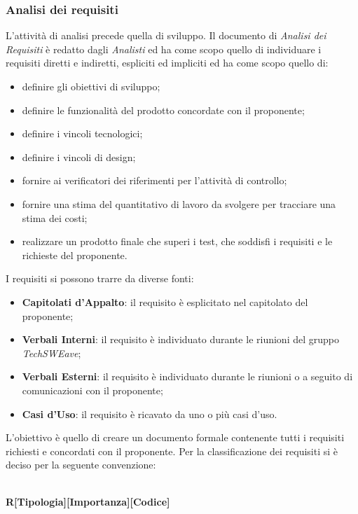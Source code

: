 \subsubsection{Analisi dei requisiti}
L’attività di analisi precede quella di sviluppo. Il documento di \textit{Analisi dei Requisiti} è redatto dagli \textit{Analisti} ed ha come scopo quello di individuare i requisiti diretti e indiretti, espliciti ed impliciti ed ha come scopo quello di:
\begin{itemize}
    \item definire gli obiettivi di sviluppo;
    \item definire le funzionalità del prodotto concordate con il proponente;
    \item definire i vincoli tecnologici;
    \item definire i vincoli di design;
    \item fornire ai verificatori dei riferimenti per l’attività di controllo;
    \item fornire una stima del quantitativo di lavoro da svolgere per tracciare una stima dei costi;
    \item realizzare un prodotto finale che superi i test, che soddisfi i requisiti e le richieste del proponente.
\end{itemize}
I requisiti si possono trarre da diverse fonti:
\begin{itemize}
    \item \textbf{Capitolati d'Appalto}: il requisito è esplicitato nel capitolato del proponente;
    \item \textbf{Verbali Interni}: il requisito è individuato durante le riunioni del gruppo \textit{TechSWEave};
    \item \textbf{Verbali Esterni}: il requisito è individuato durante le riunioni o a seguito di comunicazioni con il proponente;
    \item \textbf{Casi d'Uso}: il requisito è ricavato da uno o più casi d’uso.
\end{itemize}
L’obiettivo è quello di creare un documento formale contenente tutti i requisiti richiesti e concordati con il proponente.
Per la classificazione dei requisiti si è deciso per la seguente convenzione:\\
\\\centerline{\textbf{R[Tipologia][Importanza][Codice]}}\newline\newline
